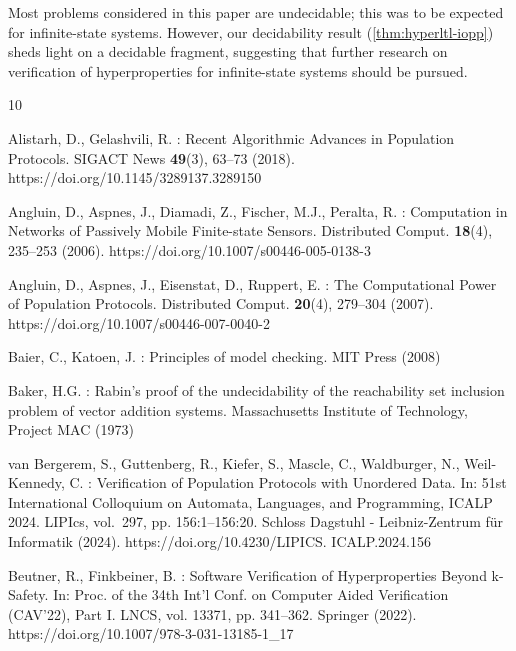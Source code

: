 \documentclass[10pt,a4paper]{article}
\begin{document}
%
Most problems considered in this paper are undecidable; this was to be expected for infinite-state systems.
However, our decidability result (\cref{thm:hyperltl-iopp}) sheds light on a decidable fragment, suggesting that further research on verification of hyperproperties for infinite-state systems should be pursued.
%

%
%
%
%
%
%
%
%
%
%
%
%
%
%
%
%
%
%

%
\begin{thebibliography}{10}
	\providecommand{\url}[1]{\texttt{#1}}
	\providecommand{\urlprefix}{URL }
	\providecommand{\doi}[1]{https://doi.org/#1}

	Alistarh, D., Gelashvili, R.
	: {Recent Algorithmic Advances in Population Protocols}. {SIGACT}
	News \textbf{49}(3), 63--73 (2018).
	\doi{10.1145/3289137.3289150}

	Angluin, D., Aspnes, J., Diamadi, Z., Fischer, M.J., Peralta, R.
	: {Computation in Networks of Passively Mobile Finite-state Sensors}.
	Distributed Comput.
	\textbf{18}(4),  235--253 (2006). \doi{10.1007/s00446-005-0138-3}

	Angluin, D., Aspnes, J., Eisenstat, D., Ruppert, E.
	: {The Computational Power of Population Protocols}.
	Distributed Comput.
	\textbf{20}(4),  279--304 (2007). \doi{10.1007/s00446-007-0040-2}

	Baier, C., Katoen, J.
	: {Principles of model checking}. {MIT}
	Press (2008)

	 Baker, H.G.
	: {Rabin's proof of the undecidability of the reachability set inclusion problem of vector addition systems}.
	Massachusetts Institute of Technology, Project MAC (1973)

	 van Bergerem, S., Guttenberg, R., Kiefer, S., Mascle, C., Waldburger, N., Weil{-}Kennedy, C.
	: {Verification of Population Protocols with Unordered Data}.
	In: 51st International Colloquium on Automata, Languages, and Programming, {ICALP} 2024.
	LIPIcs, vol.~297, pp.
	156:1--156:20.
	Schloss Dagstuhl - Leibniz-Zentrum f{\"{u}}r Informatik (2024).
	\doi{10.4230/LIPICS.
		ICALP.2024.156}

	 Beutner, R., Finkbeiner, B.
	: {Software Verification of Hyperproperties Beyond k-Safety}.
	In: Proc.
	of the 34th Int'l Conf. on Computer Aided Verification (CAV'22), Part {I}.
	LNCS, vol.
	13371, pp. 341--362.
	Springer (2022).
	\doi{10.1007/978-3-031-13185-1\_17}


\end{thebibliography}
\end{document}
